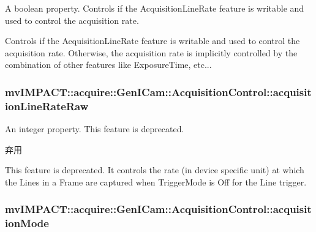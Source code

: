 A boolean property. Controls if the Acquisition\+Line\+Rate feature is writable and used to control the acquisition rate. 

Controls if the Acquisition\+Line\+Rate feature is writable and used to control the acquisition rate. Otherwise, the acquisition rate is implicitly controlled by the combination of other features like Exposure\+Time, etc... \hypertarget{classmv_i_m_p_a_c_t_1_1acquire_1_1_gen_i_cam_1_1_acquisition_control_abc83f72810dfec15d0ef47c258ca8a53}{
\subsubsection[{acquisition\+Line\+Rate\+Raw}]{ mv\+I\+M\+P\+A\+C\+T\+::acquire\+::\+Gen\+I\+Cam\+::\+Acquisition\+Control\+::acquisition\+Line\+Rate\+Raw}}\label{classmv_i_m_p_a_c_t_1_1acquire_1_1_gen_i_cam_1_1_acquisition_control_abc83f72810dfec15d0ef47c258ca8a53}


An integer property. This feature is deprecated. 

\begin{DoxyRefDesc}{弃用}
\item[\hyperlink{deprecated__deprecated000044}{弃用}]This feature is deprecated. It controls the rate (in device specific unit) at which the Lines in a Frame are captured when Trigger\+Mode is Off for the Line trigger. \end{DoxyRefDesc}
\hypertarget{classmv_i_m_p_a_c_t_1_1acquire_1_1_gen_i_cam_1_1_acquisition_control_aa07380cf251a40c38a2c7f9abbf3c0f1}{
\subsubsection[{acquisition\+Mode}]{ mv\+I\+M\+P\+A\+C\+T\+::acquire\+::\+Gen\+I\+Cam\+::\+Acquisition\+Control\+::acquisition\+Mode}}\label{classmv_i_m_p_a_c_t_1_1acquire_1_1_gen_i_cam_1_1_acquisition_control_aa07380cf251a40c38a2c7f9abbf3c0f1}


